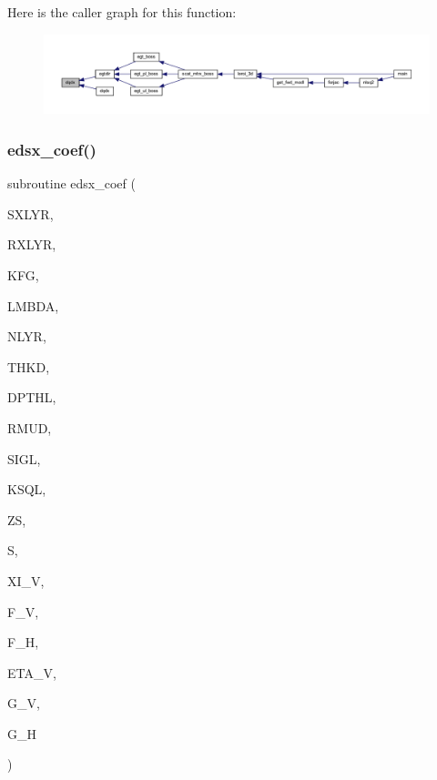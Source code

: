 Here is the caller graph for this function\+:\nopagebreak
\begin{figure}[H]
\begin{center}
\leavevmode
\includegraphics[width=350pt]{Leroi_8f90_a0dd58336077baa8c233cc4d08cc10939_icgraph}
\end{center}
\end{figure}
\mbox{\label{Leroi_8f90_a2ffa10f72b064e2c52fb28da1b335098}} 
\subsubsection{\texorpdfstring{edsx\+\_\+coef()}{edsx\_coef()}}
{\footnotesize\ttfamily subroutine edsx\+\_\+coef (\begin{DoxyParamCaption}\item[{integer}]{S\+X\+L\+YR,  }\item[{integer}]{R\+X\+L\+YR,  }\item[{integer}]{K\+FG,  }\item[{real(kind=ql)}]{L\+M\+B\+DA,  }\item[{integer}]{N\+L\+YR,  }\item[{real(kind=ql), dimension (nlyr)}]{T\+H\+KD,  }\item[{real(kind=ql), dimension (nlyr)}]{D\+P\+T\+HL,  }\item[{real(kind=ql), dimension(0\+:nlyr)}]{R\+M\+UD,  }\item[{complex(kind=ql), dimension (nlyr)}]{S\+I\+GL,  }\item[{complex(kind=ql), dimension (nlyr)}]{K\+S\+QL,  }\item[{real(kind=ql)}]{ZS,  }\item[{complex(kind=ql), dimension (0\+:nlyr)}]{S,  }\item[{complex(kind=ql)}]{X\+I\+\_\+V,  }\item[{complex(kind=ql)}]{F\+\_\+V,  }\item[{complex(kind=ql)}]{F\+\_\+H,  }\item[{complex(kind=ql)}]{E\+T\+A\+\_\+V,  }\item[{complex(kind=ql)}]{G\+\_\+V,  }\item[{complex(kind=ql)}]{G\+\_\+H }\end{DoxyParamCaption})}

